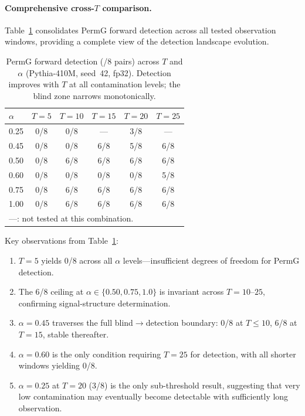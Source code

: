 \paragraph{Comprehensive cross-$T$ comparison.}
Table~\ref{tab:cross_t_full} consolidates PermG forward detection across all tested observation windows, providing a complete view of the detection landscape evolution.

\begin{table}[H]
\centering
\small
\caption{PermG forward detection (/8 pairs) across $T$ and $\alpha$ (Pythia-410M, seed~42, fp32). Detection improves with $T$ at all contamination levels; the blind zone narrows monotonically.}
\label{tab:cross_t_full}
\begin{tabular}{lccccc}
\toprule
$\alpha$ & $T{=}5$ & $T{=}10$ & $T{=}15$ & $T{=}20$ & $T{=}25$ \\
\midrule
0.25 & 0/8 & 0/8 & --- & 3/8 & --- \\
0.45 & 0/8 & 0/8 & 6/8 & 5/8 & 6/8 \\
0.50 & 0/8 & 6/8 & 6/8 & 6/8 & 6/8 \\
0.60 & 0/8 & 0/8 & 0/8 & 0/8 & 5/8 \\
0.75 & 0/8 & 6/8 & 6/8 & 6/8 & 6/8 \\
1.00 & 0/8 & 6/8 & 6/8 & 6/8 & 6/8 \\
\bottomrule
\multicolumn{6}{l}{\footnotesize ---: not tested at this combination.}
\end{tabular}
\end{table}

Key observations from Table~\ref{tab:cross_t_full}:
\begin{enumerate}
\item $T{=}5$ yields 0/8 across all $\alpha$ levels---insufficient degrees of freedom for PermG detection.
\item The 6/8 ceiling at $\alpha \in \{0.50, 0.75, 1.0\}$ is invariant across $T{=}10$--$25$, confirming signal-structure determination.
\item $\alpha{=}0.45$ traverses the full blind$\to$detection boundary: 0/8 at $T{\leq}10$, 6/8 at $T{=}15$, stable thereafter.
\item $\alpha{=}0.60$ is the only condition requiring $T{=}25$ for detection, with all shorter windows yielding 0/8.
\item $\alpha{=}0.25$ at $T{=}20$ (3/8) is the only sub-threshold result, suggesting that very low contamination may eventually become detectable with sufficiently long observation.
\end{enumerate}

